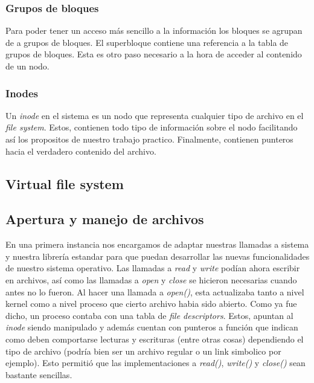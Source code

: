 \documentclass[a4paper,10pt]{article}
\begin{document}
        \subsubsection{Grupos de bloques}
        
        Para poder tener un acceso más sencillo a la información los bloques se agrupan de a grupos de bloques.
        El superbloque contiene una referencia a la tabla de grupos de bloques. Esta es otro paso necesario a la hora
        de acceder al contenido de un nodo.

        \subsubsection{Inodes}
    
        Un \textit{inode} en el sistema es un nodo que representa cualquier tipo de archivo en el \textit{file system}.
        Estos, contienen todo tipo de información sobre el nodo facilitando así los propositos de nuestro trabajo
        practico. Finalmente, contienen punteros hacia el verdadero contenido del archivo.

        \subsection{Virtual file system}
    
    \subsection{Apertura y manejo de archivos}
    En una primera instancia nos encargamos de adaptar nuestras llamadas a sistema y nuestra librería estandar
    para que puedan desarrollar las nuevas funcionalidades de nuestro sistema operativo. Las llamadas a \textit{read} y
    \textit{write} podían ahora escribir en archivos, así como las llamadas a \textit{open} y \textit{close} se hicieron
    necesarias cuando antes no lo fueron.
    Al hacer una llamada a \textit{open()}, esta actualizaba tanto a nivel kernel como a nivel proceso que cierto
    archivo habia sido abierto. Como ya fue dicho, un proceso contaba con una tabla de \textit{file descriptors}. 
    Estos, apuntan al \textit{inode} siendo manipulado y además cuentan con punteros a función que indican como 
    deben comportarse lecturas y escrituras (entre otras cosas) dependiendo el tipo de archivo 
    (podría bien ser un archivo regular o un link simbolico por ejemplo). Esto permitió que las implementaciones 
    a \textit{read()}, \textit{write()} y \textit{close()} sean bastante sencillas. 
    
\end{document}

